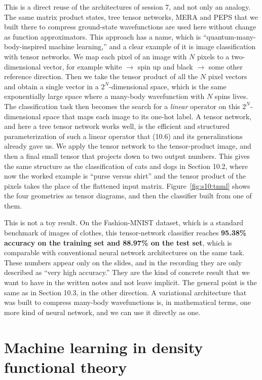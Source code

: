This is a direct reuse of the architectures of session 7, and not only an analogy. The same matrix
product states, tree tensor networks, MERA and PEPS that we built there to compress ground-state
wavefunctions are used here without change as function approximators. This approach has a name,
which is ``quantum-many-body-inspired machine learning,'' and a clear example of it is image
classification with tensor networks. We map each pixel of an image with $N$ pixels to a
two-dimensional vector, for example white $\to$ spin up and black $\to$ some other reference
direction. Then we take the tensor product of all the $N$ pixel vectors and obtain a single vector
in a $2^N$-dimensional space, which is the same exponentially large space where a many-body
wavefunction with $N$ spins lives. The classification task then becomes the search for a
\emph{linear} operator on this $2^N$-dimensional space that maps each image to its one-hot label.
A tensor network, and here a tree tensor network works well, is the efficient and structured
parameterization of such a linear operator that (10.6) and its generalizations already gave us. We
apply the tensor network to the tensor-product image, and then a final small tensor that projects
down to two output numbers. This gives the same structure as the classification of cats and dogs in
Section 10.2, where now the worked example is ``purse versus shirt'' and the tensor product of the
pixels takes the place of the flattened input matrix. Figure~\ref{fig:s10:tnml} shows the four
geometries as tensor diagrams, and then the classifier built from one of them.



This is not a toy result. On the Fashion-MNIST dataset, which is a standard benchmark of images of
clothes, this tensor-network classifier reaches \textbf{95.38\% accuracy on the training set and
88.97\% on the test set}, which is comparable with conventional neural network architectures on
the same task. These numbers appear only on the slides, and in the recording they are only
described as ``very high accuracy.'' They are the kind of concrete result that we want to have in
the written notes and not leave implicit. The general point is the same as in Section 10.3, in the
other direction. A variational architecture that was built to compress many-body wavefunctions is,
in mathematical terms, one more kind of neural network, and we can use it directly as one.

\section{Machine learning in density functional theory}

